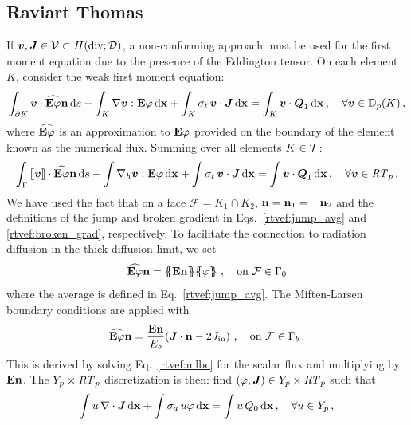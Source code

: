 \documentclass[../doc.tex]{subfiles}
\begin{document}
\subsection{Raviart Thomas}
If $\boldsymbol{v},\boldsymbol{J} \in \mathcal{V} \subset H(\operatorname{div};\mathcal{D})$, a non-conforming approach must be used for the first moment equation due to the presence of the Eddington tensor. On each element $K$, consider the weak first moment equation: 
	\begin{equation} \label{rtvef:weak_first_rt}
		\int_{\partial K} \boldsymbol{v}\cdot \widehat{\boldsymbol{\mathrm{E}}\varphi}\boldsymbol{\mathrm{n}} \mathop{}\!\mathrm{d} s - \int_K \nabla\boldsymbol{v} : \boldsymbol{\mathrm{E}}\varphi \mathop{}\!\mathrm{d} \boldsymbol{\mathrm{x}} + \int_K \sigma_t\, \boldsymbol{v}\cdot\boldsymbol{J} \mathop{}\!\mathrm{d} \boldsymbol{\mathrm{x}} = \int_K \boldsymbol{v} \cdot \boldsymbol{Q}_1 \mathop{}\!\mathrm{d} \boldsymbol{\mathrm{x}} \,, \quad \forall \boldsymbol{v} \in \mathbb{D}_p(K) \,, 
	\end{equation}
where $\widehat{\boldsymbol{\mathrm{E}}\varphi}$ is an approximation to $\boldsymbol{\mathrm{E}}\varphi$ provided on the boundary of the element known as the numerical flux. Summing over all elements $K\in\mathcal{T}$: 
	\begin{equation}
		\int_\Gamma \left\llbracket\boldsymbol{v} \right\rrbracket\cdot\widehat{\boldsymbol{\mathrm{E}}\varphi}\boldsymbol{\mathrm{n}} \mathop{}\!\mathrm{d} s - \int \nabla_h\boldsymbol{v} : \boldsymbol{\mathrm{E}}\varphi \mathop{}\!\mathrm{d} \boldsymbol{\mathrm{x}} + \int \sigma_t\, \boldsymbol{v}\cdot\boldsymbol{J} \mathop{}\!\mathrm{d} \boldsymbol{\mathrm{x}} = \int \boldsymbol{v}\cdot\boldsymbol{Q}_1 \mathop{}\!\mathrm{d} \boldsymbol{\mathrm{x}} \,, \quad \forall \boldsymbol{v} \in \mathit{RT}_p \,. 
	\end{equation}
We have used the fact that on a face $\mathcal{F} = K_1 \cap K_2$, $\boldsymbol{\mathrm{n}} = \boldsymbol{\mathrm{n}}_1 = -\boldsymbol{\mathrm{n}}_2$ and the definitions of the jump and broken gradient in Eqs.~\ref{rtvef:jump_avg} and \ref{rtvef:broken_grad}, respectively. 
To facilitate the connection to radiation diffusion in the thick diffusion limit, we set 
	\begin{equation}
		\widehat{\E\varphi}\n = \avg{\E\n}\!\avg{\varphi} \,, \quad \mathrm{on} \ \mathcal{F} \in \Gamma_0 
	\end{equation}
where the average is defined in Eq.~\ref{rtvef:jump_avg}. 
The Miften-Larsen boundary conditions are applied with 
	\begin{equation} \label{rtvef:rt_mlbc}
		\widehat{\boldsymbol{\mathrm{E}}\varphi}\boldsymbol{\mathrm{n}} = \frac{\boldsymbol{\mathrm{E}}\boldsymbol{\mathrm{n}}}{E_b}\!\left( \boldsymbol{J}\cdot\boldsymbol{\mathrm{n}} - 2J_\text{in} \right) \,, \quad \mathrm{on} \ \mathcal{F} \in \Gamma_b \,. 
	\end{equation}
This is derived by solving Eq.~\ref{rtvef:mlbc} for the scalar flux and multiplying by $\boldsymbol{\mathrm{E}}\boldsymbol{\mathrm{n}}$. The $Y_p \times \mathit{RT}_p$ discretization is then: find $(\varphi,\boldsymbol{J}) \in Y_p \times \mathit{RT}_p$ such that 
	\begin{equation}
		\int u\, \nabla\cdot\boldsymbol{J} \mathop{}\!\mathrm{d} \boldsymbol{\mathrm{x}} + \int \sigma_a\, u\varphi \mathop{}\!\mathrm{d} \boldsymbol{\mathrm{x}} = \int u\, Q_0 \mathop{}\!\mathrm{d} \boldsymbol{\mathrm{x}} \,, \quad \forall u \in Y_p \,,
	\end{equation}
\end{document}

